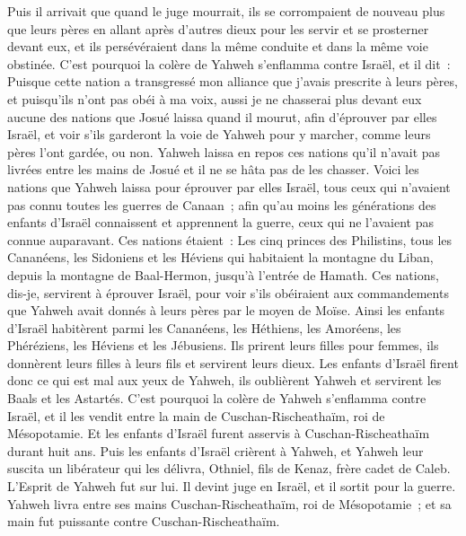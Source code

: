 \begin{multicols}{2}
Puis il arrivait que quand le juge mourrait, ils se corrompaient de nouveau plus que leurs pères en allant après d'autres dieux pour les servir et se prosterner devant eux, et ils persévéraient dans la même conduite et dans la même voie obstinée.
C'est pourquoi la colère de Yahweh s'enflamma contre Israël, et il dit~: Puisque cette nation a transgressé mon alliance que j'avais prescrite à leurs pères, et puisqu'ils n'ont pas obéi à ma voix,
aussi je ne chasserai plus devant eux aucune des nations que Josué laissa quand il mourut,
afin d'éprouver par elles Israël, et voir s'ils garderont la voie de Yahweh pour y marcher, comme leurs pères l'ont gardée, ou non.
Yahweh laissa en repos ces nations qu'il n'avait pas livrées entre les mains de Josué et il ne se hâta pas de les chasser.
\VerseOne{}Voici les nations que Yahweh laissa pour éprouver par elles Israël, tous ceux qui n'avaient pas connu toutes les guerres de Canaan~; 
afin qu'au moins les générations des enfants d'Israël connaissent et apprennent la guerre, ceux qui ne l'avaient pas connue auparavant.
Ces nations étaient~: Les cinq princes des Philistins, tous les Cananéens, les Sidoniens et les Héviens qui habitaient la montagne du Liban, depuis la montagne de Baal-Hermon, jusqu'à l'entrée de Hamath.
Ces nations, dis-je, servirent à éprouver Israël, pour voir s'ils obéiraient aux commandements que Yahweh avait donnés à leurs pères par le moyen de Moïse.
Ainsi les enfants d'Israël habitèrent parmi les Cananéens, les Héthiens, les Amoréens, les Phéréziens, les Héviens et les Jébusiens.
Ils prirent leurs filles pour femmes, ils donnèrent leurs filles à leurs fils et servirent leurs dieux.
Les enfants d'Israël firent donc ce qui est mal aux yeux de Yahweh, ils oublièrent Yahweh et servirent les Baals et les Astartés.
C'est pourquoi la colère de Yahweh s'enflamma contre Israël, et il les vendit entre la main de Cuschan-Rischeathaïm, roi de Mésopotamie. Et les enfants d'Israël furent asservis à Cuschan-Rischeathaïm durant huit ans.
Puis les enfants d'Israël crièrent à Yahweh, et Yahweh leur suscita un libérateur qui les délivra, Othniel, fils de Kenaz, frère cadet de Caleb.
L'Esprit de Yahweh fut sur lui. Il devint juge en Israël, et il sortit pour la guerre. Yahweh livra entre ses mains Cuschan-Rischeathaïm, roi de Mésopotamie~; et sa main fut puissante contre Cuschan-Rischeathaïm.

\end{multicols}
